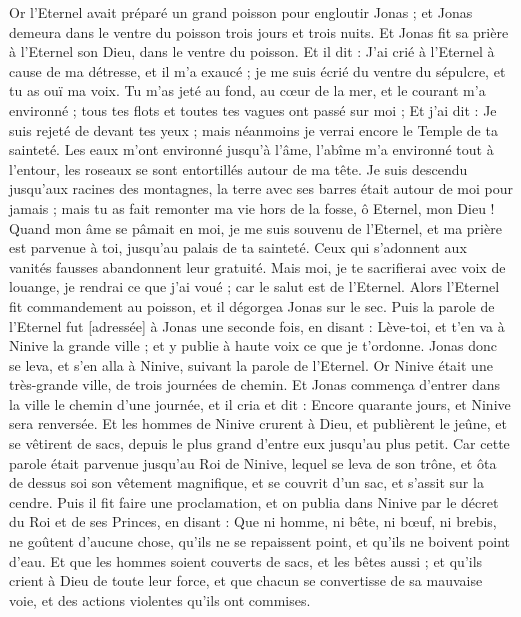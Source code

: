 \begin{multicols}{2}
\VerseOne{}Or l'Eternel avait préparé un grand poisson pour engloutir Jonas ; et Jonas demeura dans le ventre du poisson trois jours et trois nuits.
Et Jonas fit sa prière à l'Eternel son Dieu, dans le ventre du poisson.
Et il dit : J'ai crié à l'Eternel à cause de ma détresse, et il m'a exaucé ; je me suis écrié du ventre du sépulcre, et tu as ouï ma voix.
Tu m'as jeté au fond, au cœur de la mer, et le courant m'a environné ; tous tes flots et toutes tes vagues ont passé sur moi ;
Et j'ai dit : Je suis rejeté de devant tes yeux ; mais néanmoins je verrai encore le Temple de ta sainteté.
Les eaux m'ont environné jusqu'à l'âme, l'abîme m'a environné tout à l'entour, les roseaux se sont entortillés autour de ma tête.
Je suis descendu jusqu'aux racines des montagnes, la terre avec ses barres était autour de moi pour jamais ; mais tu as fait remonter ma vie hors de la fosse, ô Eternel, mon Dieu !
Quand mon âme se pâmait en moi, je me suis souvenu de l'Eternel, et ma prière est parvenue à toi, jusqu'au palais de ta sainteté.
Ceux qui s'adonnent aux vanités fausses abandonnent leur gratuité.
Mais moi, je te sacrifierai avec voix de louange, je rendrai ce que j'ai voué ; car le salut est de l'Eternel.
Alors l'Eternel fit commandement au poisson, et il dégorgea Jonas sur le sec.
\VerseOne{}Puis la parole de l'Eternel fut [adressée] à Jonas une seconde fois, en disant :
Lève-toi, et t'en va à Ninive la grande ville ; et y publie à haute voix ce que je t'ordonne.
Jonas donc se leva, et s'en alla à Ninive, suivant la parole de l'Eternel. Or Ninive était une très-grande ville, de trois journées de chemin.
Et Jonas commença d'entrer dans la ville le chemin d'une journée, et il cria et dit : Encore quarante jours, et Ninive sera renversée.
Et les hommes de Ninive crurent à Dieu, et publièrent le jeûne, et se vêtirent de sacs, depuis le plus grand d'entre eux jusqu'au plus petit.
Car cette parole était parvenue jusqu'au Roi de Ninive, lequel se leva de son trône, et ôta de dessus soi son vêtement magnifique, et se couvrit d'un sac, et s'assit sur la cendre.
Puis il fit faire une proclamation, et on publia dans Ninive par le décret du Roi et de ses Princes, en disant : Que ni homme, ni bête, ni bœuf, ni brebis, ne goûtent d'aucune chose, qu'ils ne se repaissent point, et qu'ils ne boivent point d'eau.
Et que les hommes soient couverts de sacs, et les bêtes aussi ; et qu'ils crient à Dieu de toute leur force, et que chacun se convertisse de sa mauvaise voie, et des actions violentes qu'ils ont commises.

\end{multicols}
